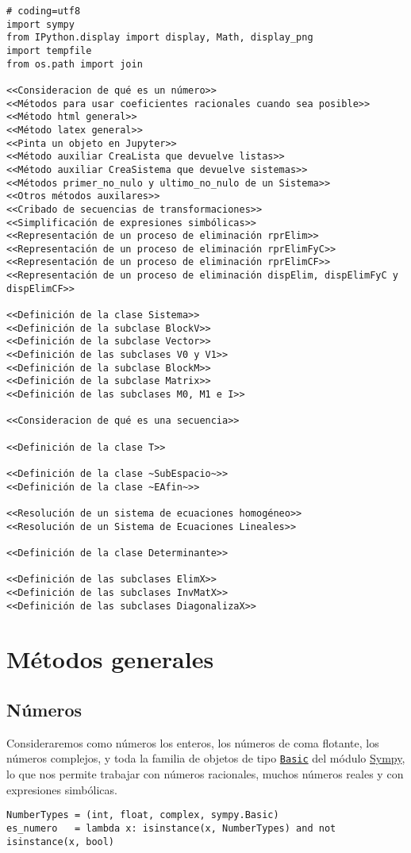 \documentclass[11pt]{report}
\begin{document}
\begin{verbatim}
# coding=utf8
import sympy
from IPython.display import display, Math, display_png
import tempfile
from os.path import join           

<<Consideracion de qué es un número>>
<<Métodos para usar coeficientes racionales cuando sea posible>>
<<Método html general>>
<<Método latex general>>
<<Pinta un objeto en Jupyter>>
<<Método auxiliar CreaLista que devuelve listas>>
<<Método auxiliar CreaSistema que devuelve sistemas>>
<<Métodos primer_no_nulo y ultimo_no_nulo de un Sistema>>
<<Otros métodos auxilares>>
<<Cribado de secuencias de transformaciones>>
<<Simplificación de expresiones simbólicas>>
<<Representación de un proceso de eliminación rprElim>>
<<Representación de un proceso de eliminación rprElimFyC>>
<<Representación de un proceso de eliminación rprElimCF>>
<<Representación de un proceso de eliminación dispElim, dispElimFyC y dispElimCF>>

<<Definición de la clase Sistema>>
<<Definición de la subclase BlockV>>
<<Definición de la subclase Vector>>
<<Definición de las subclases V0 y V1>>
<<Definición de la subclase BlockM>>
<<Definición de la subclase Matrix>>
<<Definición de las subclases M0, M1 e I>>

<<Consideracion de qué es una secuencia>>

<<Definición de la clase T>>

<<Definición de la clase ~SubEspacio~>>
<<Definición de la clase ~EAfin~>>

<<Resolución de un sistema de ecuaciones homogéneo>>
<<Resolución de un Sistema de Ecuaciones Lineales>>

<<Definición de la clase Determinante>>

<<Definición de las subclases ElimX>>
<<Definición de las subclases InvMatX>>
<<Definición de las subclases DiagonalizaX>>
\end{verbatim}


\chapter{Métodos generales}
\label{sec:orga63eed7}

\section{Números}
\label{sec:org32459c1}

Consideraremos como números los enteros, los números de coma flotante,
los números complejos, y toda la familia de objetos de tipo \href{https://docs.sympy.org/latest/modules/core.html\#sympy.core.basic.Basic}{\texttt{Basic}}
del módulo \href{https://docs.sympy.org/latest/index.html}{Sympy}, lo que nos permite trabajar con números racionales,
muchos números reales y con expresiones simbólicas.
\begin{verbatim}
NumberTypes = (int, float, complex, sympy.Basic)
es_numero   = lambda x: isinstance(x, NumberTypes) and not isinstance(x, bool)
\end{verbatim}
\end{document}
